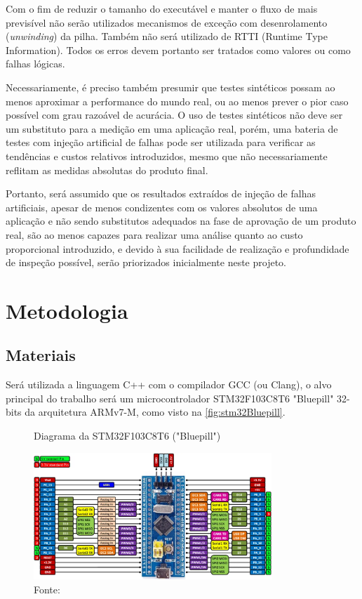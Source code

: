 Com o fim de reduzir o tamanho do executável e manter o fluxo de mais previsível não serão utilizados mecanismos de exceção com desenrolamento (\textit{unwinding}) da pilha. Também não será utilizado de RTTI (Runtime Type Information). Todos os erros devem portanto ser tratados como valores ou como falhas lógicas.

Necessariamente, é preciso também presumir que testes sintéticos possam ao menos aproximar a performance do mundo real, ou ao menos prever o pior caso possível com grau razoável de acurácia. O uso de testes sintéticos não deve ser um substituto para a medição em uma aplicação real, porém, uma bateria de testes com injeção artificial de falhas pode ser utilizada para verificar as tendências e custos relativos introduzidos, mesmo que não necessariamente reflitam as medidas absolutas do produto final.

Portanto, será assumido que os resultados extraídos de injeção de falhas artificiais, apesar de menos condizentes com os valores absolutos de uma aplicação e não sendo substitutos adequados na fase de aprovação de um produto real, são ao menos capazes para realizar uma análise quanto ao custo proporcional introduzido, e devido à sua facilidade de realização e profundidade de inspeção possível, serão priorizados inicialmente neste projeto.

\section{Metodologia}

\subsection{Materiais}

Será utilizada a linguagem C++ com o compilador GCC (ou Clang), o alvo principal do trabalho será um microcontrolador STM32F103C8T6 "Bluepill" 32-bits da arquitetura ARMv7-M, como visto na \autoref{fig:stm32Bluepill}.

\begin{figure}[H]
    \centering
    \captionsetup{justification=centering}
    \caption{Diagrama da STM32F103C8T6 ("Bluepill")}
    \includegraphics[width=0.80\textwidth]{assets/stm32_bluepill.png}
    \captionsetup{justification=raggedright}
    \caption*{Fonte: }
    \label{fig:stm32Bluepill}
\end{figure}

